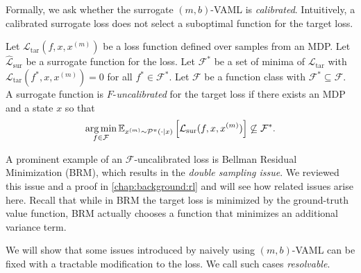 Formally, we ask whether the surrogate $(m,b)$-VAML is \emph{calibrated}.
Intuitively, a calibrated surrogate loss does not select a suboptimal function for the target loss.
\begin{definition}
    Let $\mathcal{L}_\mathrm{tar}(f,x,x^{(m)})$ be a loss function defined over samples from an MDP.
    Let $\hat{\mathcal{L}}_\mathrm{sur}$ be a surrogate function for the loss.
    Let $\mathcal{F}^*$ be a set of minima of $\mathcal{L}_\mathrm{tar}$ with $\mathcal{L}_\mathrm{tar}(f^*,x,x^{(m)}) = 0$ for all $f^* \in \mathcal{F}^*.$
    Let $\mathcal{F}$ be a function class with $\mathcal{F}^* \subseteq \mathcal{F}$.
    A surrogate function is $F$-\emph{uncalibrated} for the target loss if there exists an MDP and a state $x$ so that 
    $$\operatorname*{arg\,min}_{f \in \mathcal{F}} \mathbb{E}_{x^{(m)}\sim\mathcal{P}^\pi(\cdot|x)}\left[\mathcal{L}_\mathrm{sur}(f,x,x^{(m)})\right] \not\subseteq \mathcal{F}^*.$$
\end{definition}
%
A prominent example of an $\mathcal{F}$-uncalibrated loss is Bellman Residual Minimization (BRM), which results in the \emph{double sampling issue}.
We reviewed this issue and a proof in \autoref{chap:background:rl} and will see how related issues arise here.
Recall that while in BRM the target loss is minimized by the ground-truth value function, BRM actually chooses a function that minimizes an additional variance term.

We will show that some issues introduced by naively using $(m,b)$-VAML can be fixed with a tractable modification to the loss.
We call such cases \emph{resolvable}.


